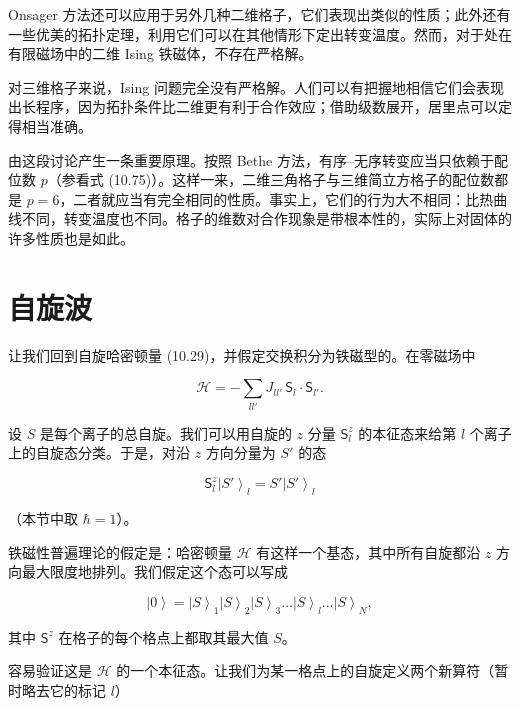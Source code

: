 Onsager 方法还可以应用于另外几种二维格子，它们表现出类似的性质；此外还有一些优美的拓扑定理，利用它们可以在其他情形下定出转变温度。然而，对于处在有限磁场中的二维 Ising 铁磁体，不存在严格解。

对三维格子来说，Ising 问题完全没有严格解。人们可以有把握地相信它们会表现出长程序，因为拓扑条件比二维更有利于合作效应；借助级数展开，居里点可以定得相当准确。

由这段讨论产生一条重要原理。按照 Bethe 方法，有序–无序转变应当只依赖于配位数 $p$（参看式 (10.75)）。这样一来，二维三角格子与三维简立方格子的配位数都是 $p = 6$，二者就应当有完全相同的性质。事实上，它们的行为大不相同：比热曲线不同，转变温度也不同。格子的维数对合作现象是带根本性的，实际上对固体的许多性质也是如此。


\section{自旋波}

让我们回到自旋哈密顿量 (10.29)，并假定交换积分为铁磁型的。在零磁场中

\begin{equation*}
\mathcal{H} = -\sum_{ll'} J_{ll'}\,\mathsf{S}_l \cdot \mathsf{S}_{l'}.
\tag{10.100}
\end{equation*}

设 $S$ 是每个离子的总自旋。我们可以用自旋的 $z$ 分量 $\mathsf{S}_l^z$ 的本征态来给第 $l$ 个离子上的自旋态分类。于是，对沿 $z$ 方向分量为 $S'$ 的态

\begin{equation*}
\mathsf{S}_l^z\left|S'\right\rangle_l = S'\left|S'\right\rangle_l
\tag{10.101}
\end{equation*}

（本节中取 $\hbar = 1$）。

铁磁性普遍理论的假定是：哈密顿量 $\mathcal{H}$ 有这样一个基态，其中所有自旋都沿 $z$ 方向最大限度地排列。我们假定这个态可以写成

\begin{equation*}
\left|0\right\rangle = \left|S\right\rangle_1\left|S\right\rangle_2\left|S\right\rangle_3\ldots\left|S\right\rangle_l\ldots\left|S\right\rangle_N,
\tag{10.102}
\end{equation*}

其中 $\mathsf{S}^z$ 在格子的每个格点上都取其最大值 $S$。

容易验证这是 $\mathcal{H}$ 的一个本征态。让我们为某一格点上的自旋定义两个新算符（暂时略去它的标记 $l$）

